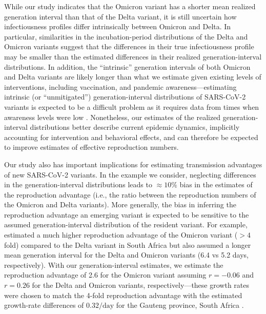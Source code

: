 \documentclass[12pt]{article}
\begin{document}
While our study indicates that the Omicron variant has a shorter mean realized generation interval than that of the Delta variant, it is still uncertain how infectiousness profiles differ intrinsically between Omicron and Delta.
In particular, similarities in the incubation-period distributions of the Delta and Omicron variants suggest that the differences in their true infectiousness profile may be smaller than the estimated differences in their realized generation-interval distributions.
In addition, the ``intrinsic'' generation intervals of both Omicron and Delta variants are likely longer than what we estimate given existing levels of interventions, including vaccination, and pandemic awareness---estimating intrinsic (or ``unmitigated'') generation-interval distributions of SARS-CoV-2 variants is expected to be a difficult problem as it requires data from times when awareness levels were low \citep{sender2021unmitigated}.
Nonetheless, our estimates of the realized generation-interval distributions better describe current epidemic dynamics, implicitly accounting for intervention and behavioral effects,
and can therefore be expected to improve estimates of effective reproduction numbers.

Our study also has important implications for estimating transmission advantages of new SARS-CoV-2 variants.
In the example we consider, neglecting differences in the generation-interval distributions leads to $\approx 10\%$ bias in the estimates of the reproduction advantage (i.e., the ratio between the reproduction numbers of the Omicron and Delta variants).
More generally, the bias in inferring the reproduction advantage an emerging variant is expected to be sensitive to the assumed generation-interval distribution of the resident variant.
For example, \cite{pearson2021bounding} estimated a much higher reproduction advantage of the Omicron variant ($> 4$ fold) compared to the Delta variant in South Africa but also assumed a longer mean generation interval for the Delta and Omicron variants (6.4 vs 5.2 days, respectively).
With our generation-interval estimates, we estimate the reproduction advantage of 2.6 for the Omicron variant assuming $r=-0.06$ and $r=0.26$ for the Delta and Omicron variants, respectively---these growth rates were chosen to match the 4-fold reproduction advantage with the estimated growth-rate differences of $0.32/\mathrm{day}$ for the Gauteng province, South Africa \cite{pearson2021bounding}.
\end{document}
